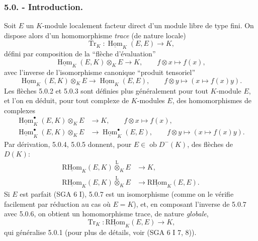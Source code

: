 \documentclass[11pt]{article}
\DeclareMathOperator{\Hom}{Hom}
\newcommand{\R}{\mathrm{R}}\newcommand{\RHomCore}{\mathrm{RHom}}
\newcommand{\ob}{\operatorname{ob}}
\providecommand{\RHom}{\RHomCore}
\providecommand{\uRHom}{\underline{\RHom}}
\providecommand{\uHom}{\underline{\Hom}}
\providecommand{\Tr}{\operatorname{Tr}}
\providecommand{\Tr}{\operatorname{Tr}}
\providecommand{\lten}{\overset{\mathrm L}{\otimes}}
\providecommand{\Tr}{\operatorname{Tr}}
\providecommand{\RHom}{\RHomCore}
\providecommand{\Hom}{\operatorname{Hom}}
\providecommand{\ob}{\operatorname{ob}}
\providecommand{\lten}{\overset{\mathrm L}{\otimes}}
\providecommand{\RHom}{\R\mathcal{H}om}
\providecommand{\lten}{\overset{\mathrm L}{\otimes}}
\providecommand{\R}{\mathrm R}
\providecommand{\Tr}{\operatorname{Tr}}
\providecommand{\lten}{\overset{\mathrm L}{\otimes}}
\providecommand{\lten}{\overset{\mathrm L}{\otimes}}
\providecommand{\lten}{\overset{\mathrm L}{\otimes}}
\providecommand{\RHom}{\RHomCore}
\providecommand{\Hom}{\operatorname{Hom}}
\providecommand{\Tr}{\operatorname{Tr}}
\providecommand{\lten}{\overset{\mathrm L}{\otimes}}
\begin{document}
\subsubsection*{5.0. - Introduction.}

Soit $E$ un $K$-module localement facteur direct d'un module libre de type fini. On dispose alors d'un homomorphisme \emph{trace} (de nature locale)
\begin{equation}\tag{5.0.1}
\Tr_K:\uHom_K(E,E)\longrightarrow K,
\end{equation}
défini par composition de la ``flèche d'évaluation''
\begin{equation}\tag{5.0.2}
\uHom_K(E,K)\otimes_KE\longrightarrow K,\qquad f\otimes x\longmapsto f(x),
\end{equation}
avec l'inverse de l'isomorphisme canonique ``produit tensoriel''
\begin{equation}\tag{5.0.3}
\uHom_K(E,K)\otimes_KE\longrightarrow\uHom_K(E,E),\qquad f\otimes y\longmapsto (x\longmapsto f(x)y).
\end{equation}
Les flèches 5.0.2 et 5.0.3 sont définies plus généralement pour tout $K$-module $E$, et l'on en déduit, pour tout complexe de $K$-modules $E$, des homomorphismes de complexes
\begin{align}
\uHom_K^\bullet(E,K)\otimes_KE&\longrightarrow K,\qquad f\otimes x\longmapsto f(x),\tag{5.0.4}\\
\uHom_K^\bullet(E,K)\otimes_KE&\longrightarrow \uHom_K^\bullet(E,E),\qquad f\otimes y\longmapsto (x\longmapsto f(x)y).\tag{5.0.5}
\end{align}
Par dérivation, 5.0.4, 5.0.5 donnent, pour $E\in\ob D^-(K)$, des flèches de $D(K)$:
\begin{align}
\uRHom_K(E,K)\lten_KE&\longrightarrow K,\tag{5.0.6}\\
\uRHom_K(E,K)\lten_KE&\longrightarrow\uRHom_K(E,E).\tag{5.0.7}
\end{align}
Si $E$ est
parfait (SGA 6 I), 5.0.7 est un isomorphisme (comme on le vérifie facilement par réduction au cas où $E=K$), et, en composant l'inverse de 5.0.7 avec 5.0.6, on obtient un homomorphisme trace, de nature \emph{globale},
\begin{equation}\tag{5.0.8}
\Tr_K:\uRHom_K(E,E)\longrightarrow K,
\end{equation}
qui généralise 5.0.1 (pour plus de détails, voir (SGA 6 I 7, 8)).
\end{document}
